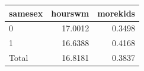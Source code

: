 
\begin{tabular}{lrr}
\toprule
samesex & hourswm & morekids\\
\midrule
0 & 17.0012 & 0.3498\\
1 & 16.6388 & 0.4168\\
Total & 16.8181 & 0.3837\\
\bottomrule
\end{tabular}
